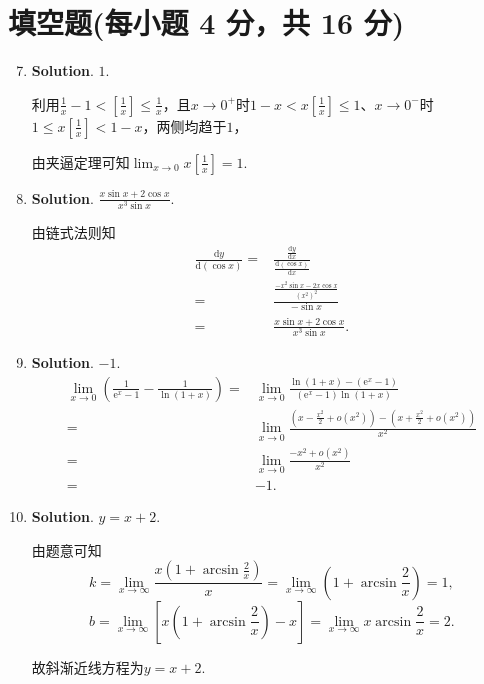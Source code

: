 \documentclass[../main.tex]{subfiles}
\begin{document}
\section{填空题(每小题 4 分，共 16 分)}
\begin{enumerate}
    \setcounter{enumi}{6}
    \item \textbf{Solution}. $1$.

          利用$\frac{1}{x}-1<\left[\frac{1}{x}\right]\leq\frac{1}{x}$，且$x\to0^{+}$时$1-x<x\left[\frac{1}{x}\right]\leq1$、$x\to0^{-}$时$1\leq x\left[\frac{1}{x}\right]<1-x$，两侧均趋于$1$，

          由夹逼定理可知$\lim_{x\to0}x\left[\frac{1}{x}\right]=1$.

    \item \textbf{Solution}. $\frac{x\sin x+2\cos x}{x^{3}\sin x}$.

          由链式法则知
          \[
              \begin{aligned}
                  \frac{\mathrm{d}y}{\mathrm{d}(\cos x)} = {} & \frac{\frac{\mathrm{d}y}{\mathrm{d}x}}{\frac{\mathrm{d}(\cos x)}{\mathrm{d}x}} \\
                  = {}                                        & \frac{\frac{-x^{2}\sin x - 2x\cos x}{(x^{2})^{2}}}{-\sin x}                    \\
                  = {}                                        & \frac{x\sin x+2\cos x}{x^{3}\sin x}.
              \end{aligned}
          \]

    \item \textbf{Solution}. $-1$.
          \[
              \begin{aligned}
                  \lim_{x\to0}\left(\frac{1}{\mathrm{e}^x-1}-\frac{1}{\ln(1+x)}\right) = {} & \lim_{x\to0}\frac{\ln(1+x)-(\mathrm{e}^x-1)}{(\mathrm{e}^x-1)\ln(1+x)}                          \\
                  = {}                                                                      & \lim_{x\to0}\frac{\left(x-\frac{x^2}{2}+o(x^2)\right)-\left(x+\frac{x^2}{2}+o(x^2)\right)}{x^2} \\
                  = {}                                                                      & \lim_{x\to0}\frac{-x^2+o(x^2)}{x^2}                                                             \\
                  = {}                                                                      & -1.
              \end{aligned}
          \]

    \item \textbf{Solution}. $y=x+2$.

          由题意可知
          \[
              k=\lim_{x\to\infty}\frac{x\left(1+\arcsin\frac{2}{x}\right)}{x}=\lim_{x\to\infty}
              \left(1+\arcsin\frac{2}{x}\right)=1,
          \]
          \[
              b=\lim_{x\to\infty}\left[x\left(1+\arcsin\frac{2}{x}\right)-x\right]=\lim_{x\to\infty}
              x\arcsin\frac{2}{x}=2.
          \]

          故斜渐近线方程为$y=x+2$.
\end{enumerate}
\end{document}
